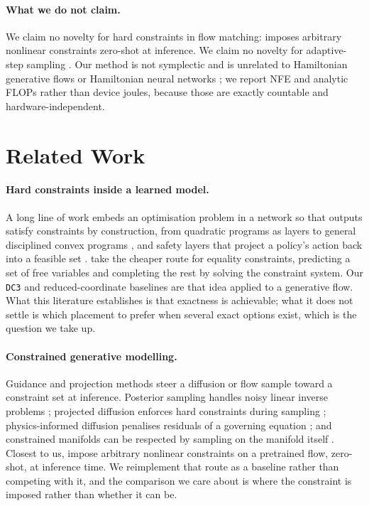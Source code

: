 \documentclass{article}
\newcommand{\dataset}[1]{\texttt{#1}}
\begin{document}
\paragraph{What we do not claim.} We claim no novelty for hard constraints in flow matching: \citet{utkarsh2025pcfm} imposes arbitrary nonlinear constraints zero-shot at inference. We claim no novelty for adaptive-step sampling \citep{dormand1980family,chen2018neural}. Our method is not symplectic and is unrelated to Hamiltonian generative flows \citep{holderrieth2024hamiltonian} or Hamiltonian neural networks \citep{greydanus2019hamiltonian}; we report NFE and analytic FLOPs rather than device joules, because those are exactly countable and hardware-independent.

\section{Related Work}\label{sec:related}
\paragraph{Hard constraints inside a learned model.} A long line of work embeds
an optimisation problem in a network so that outputs satisfy constraints by
construction, from quadratic programs as layers \citep{amos2017optnet} to general
disciplined convex programs \citep{agrawal2019cvxlayers}, and safety layers that project
a policy's action back into a feasible set \citep{dalal2018safetylayer}.
\citet{donti2021dc3} take the cheaper route for equality constraints, predicting a set
of free variables and completing the rest by solving the constraint system. Our
\dataset{DC3} and reduced-coordinate baselines are that idea applied to a generative
flow. What this literature establishes is that exactness is achievable; what it does not
settle is which placement to prefer when several exact options exist, which is the
question we take up.

\paragraph{Constrained generative modelling.} Guidance and projection methods
steer a diffusion or flow sample toward a constraint set at inference. Posterior sampling
handles noisy linear inverse problems \citep{chung2023dps}; projected diffusion enforces
hard constraints during sampling \citep{christopher2024projected}; physics-informed
diffusion penalises residuals of a governing equation \citep{bastek2025pidm}; and
constrained manifolds can be respected by sampling on the manifold itself
\citep{fishman2023metropolis}. Closest to us, \citet{utkarsh2025pcfm} impose arbitrary
nonlinear constraints on a pretrained flow, zero-shot, at inference time. We reimplement
that route as a baseline rather than competing with it, and the comparison we care about
is where the constraint is imposed rather than whether it can be.
\end{document}
